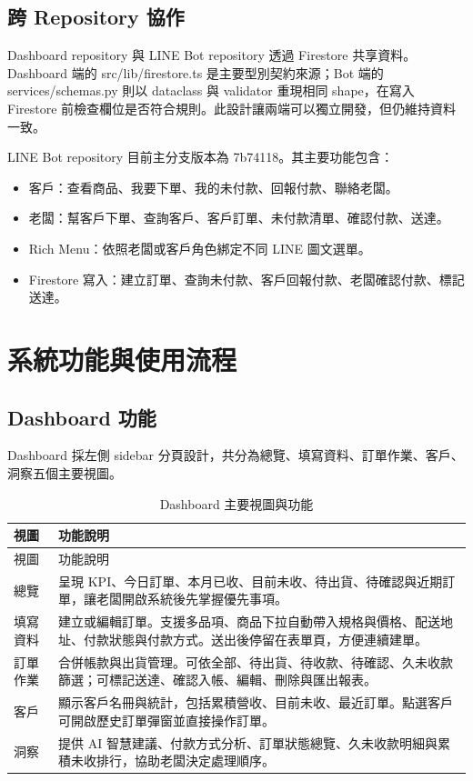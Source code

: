\documentclass[12pt,a4paper,UTF8,fontset=none]{ctexart}
\newcommand{\code}[1]{{\ttfamily\small #1}}
\begin{document}
\subsection{跨 Repository 協作}

Dashboard repository 與 LINE Bot repository 透過 Firestore 共享資料。Dashboard 端的 \code{src/lib/firestore.ts} 是主要型別契約來源；Bot 端的 \code{services/schemas.py} 則以 dataclass 與 validator 重現相同 shape，在寫入 Firestore 前檢查欄位是否符合規則。此設計讓兩端可以獨立開發，但仍維持資料一致。

LINE Bot repository 目前主分支版本為 \code{7b74118}。其主要功能包含：

\begin{itemize}
  \item 客戶：查看商品、我要下單、我的未付款、回報付款、聯絡老闆。
  \item 老闆：幫客戶下單、查詢客戶、客戶訂單、未付款清單、確認付款、送達。
  \item Rich Menu：依照老闆或客戶角色綁定不同 LINE 圖文選單。
  \item Firestore 寫入：建立訂單、查詢未付款、客戶回報付款、老闆確認付款、標記送達。
\end{itemize}

\section{系統功能與使用流程}

\subsection{Dashboard 功能}

Dashboard 採左側 sidebar 分頁設計，共分為總覽、填寫資料、訂單作業、客戶、洞察五個主要視圖。

\begin{longtable}{L{2.7cm}L{10.8cm}}
  \caption{Dashboard 主要視圖與功能} \\
  \toprule
  視圖 & 功能說明 \\
  \midrule
  \endfirsthead
  \toprule
  視圖 & 功能說明 \\
  \midrule
  \endhead
  總覽 &
  呈現 KPI、今日訂單、本月已收、目前未收、待出貨、待確認與近期訂單，讓老闆開啟系統後先掌握優先事項。 \\
  填寫資料 &
  建立或編輯訂單。支援多品項、商品下拉自動帶入規格與價格、配送地址、付款狀態與付款方式。送出後停留在表單頁，方便連續建單。 \\
  訂單作業 &
  合併帳款與出貨管理。可依全部、待出貨、待收款、待確認、久未收款篩選；可標記送達、確認入帳、編輯、刪除與匯出報表。 \\
  客戶 &
  顯示客戶名冊與統計，包括累積營收、目前未收、最近訂單。點選客戶可開啟歷史訂單彈窗並直接操作訂單。 \\
  洞察 &
  提供 AI 智慧建議、付款方式分析、訂單狀態總覽、久未收款明細與累積未收排行，協助老闆決定處理順序。 \\
  \bottomrule
\end{longtable}
\end{document}
